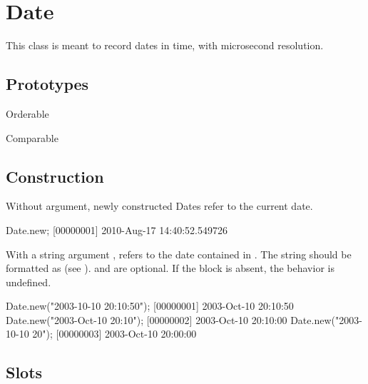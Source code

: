 
\section{Date}

This class is meant to record dates in time, with microsecond resolution.
\experimental{}

\subsection{Prototypes}
\begin{refObjects}
\item[Orderable]
\item[Comparable]
\end{refObjects}

\subsection{Construction}

Without argument, newly constructed Dates refer to the current date.

\begin{urbiunchecked}[firstnumber=1]
Date.new;
[00000001] 2010-Aug-17 14:40:52.549726
\end{urbiunchecked}

With a string argument , refers to the date contained in .
The string should be formatted as  (see ). 
and  are optional. If the block 
is absent, the behavior is undefined.


\begin{urbiscript}
Date.new("2003-10-10 20:10:50");
[00000001] 2003-Oct-10 20:10:50
Date.new("2003-Oct-10 20:10");
[00000002] 2003-Oct-10 20:10:00
Date.new("2003-10-10 20");
[00000003] 2003-Oct-10 20:00:00
\end{urbiscript}

\subsection{Slots}

